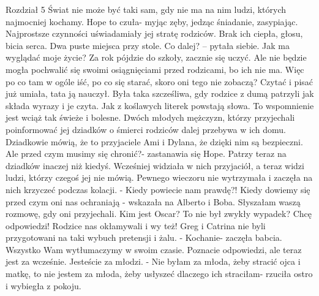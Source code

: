 \documentclass[12pt,a4paper]{book}
\begin{document}
Rozdział 5
Świat nie może być taki sam, gdy nie ma na nim ludzi, których najmocniej kochamy. Hope to czuła- myjąc zęby, jedząc śniadanie, zasypiając. Najprostsze czynności uświadamiały jej stratę rodziców. Brak ich ciepła, głosu, bicia serca. Dwa puste miejsca przy stole. Co dalej? – pytała siebie. Jak ma wyglądać moje życie? Za rok pójdzie do szkoły, zacznie się uczyć. Ale nie będzie mogła pochwalić się swoimi osiągnięciami przed rodzicami, bo ich nie ma. Więc po co tam w ogóle iść, po co się starać, skoro oni tego nie zobaczą? Czytać i pisać już umiała, tata ją nauczył. Była taka szcześliwa, gdy rodzice z dumą patrzyli jak składa wyrazy i je czyta. Jak z koślawych literek powstają słowa. To wspomnienie jest wciąż tak świeże i bolesne. 
Dwóch młodych mężczyzn, którzy przyjechali poinformować jej dziadków o śmierci rodziców dalej przebywa w ich domu. Dziadkowie mówią, że to przyjaciele Ami i Dylana, że dzięki nim są bezpieczni. Ale przed czym musimy się chronić?- zastanawia się Hope. Patrzy teraz na dziadków inaczej niż kiedyś. Wcześniej widziała w nich przyjaciół, a teraz widzi ludzi, którzy czegoś jej nie mówią. Pewnego wieczoru nie wytrzymała i zaczęła na nich krzyczeć podczas kolacji. 
- Kiedy powiecie nam prawdę?! Kiedy dowiemy się przed czym oni nas ochraniają - wskazała na Alberto i Boba. Słyszałam waszą rozmowę, gdy oni przyjechali. Kim jest Oscar? To nie był zwykły wypadek? Chcę odpowiedzi! Rodzice nas okłamywali i wy też!
Greg i Catrina nie byli przygotowani na taki wybuch pretensji i żalu. 
- Kochanie- zaczęła babcia. Wszystko Wam wytłumaczymy w swoim czasie. Poznacie odpowiedzi, ale teraz jest za wcześnie. Jesteście za młodzi. 
- Nie byłam za młoda, żeby stracić ojca i matkę, to nie jestem za młoda, żeby usłyszeć dlaczego ich straciłam- rzuciła ostro i wybiegła z pokoju. 
\end{document}
